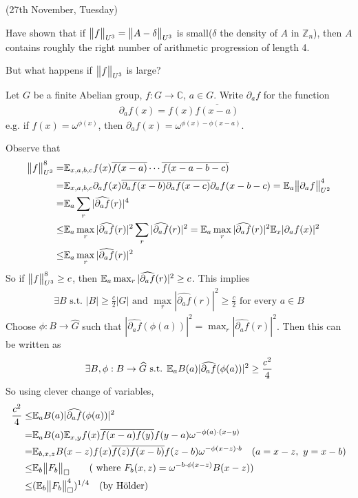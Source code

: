 \documentclass[12pt,a4paper]{report}
\renewcommand{\hat}{\widehat}
\begin{document}
\newday

(27th November, Tuesday)
\s

Have shown that if $\bigl\lVert f\bigr\rVert_{U^3} = \bigl\lVert A-\delta\bigr\rVert_{U^3}$ is small($\delta$ the density of $A$ in $\mathbb{Z}_n$), then $A$ contains roughly the right number of arithmetic progression of length 4.

\quad But what happens if $\bigl\lVert f\bigr\rVert_{U^3}$ is large?
\s

 Let $G$ be a finite Abelian group, $f: G\rightarrow \mathbb{C}$, $a\in G$. Write $\partial_a f$ for the function
\begin{align*}
\partial_a f(x) = f(x) \overline{f(x-a)}
\end{align*}
e.g. if $f(x) = \omega^{\phi(x)}$, then $\partial_a f(x) = \omega^{\phi(x) - \phi(x-a)}$.
\s

Observe that 
\begin{align*}
\norms{f}{U^3}^8 =& \avg_{x,a,b,c} f(x) \bar{f(x-a)} \cdots \bar{f(x-a-b-c)} \\
=& \avg_{x,a,b,c} \partial_a f(x) \bar{\partial_a f(x-b)} \bar{\partial_a f(x-c)} \partial_a f(x-b-c) = \avg_a \norms{\partial_a f}{U^2}^4 \\
=& \avg_a \sum_r |\hat{\partial_a f}(r)|^4 \\
\leq & \avg_a \max_r |\hat{\partial_a f}(r)|^2 \sum_r |\hat{\partial_a f}(r)|^2 = \avg_a \max_r |\hat{\partial_a f}(r)|^2 \avg_x | \partial_a f(x) |^2 \\
\leq & \avg_a \max_r |\hat{\partial_a f}(r)|^2
\end{align*}
So if $\bigl\lVert f\bigr\rVert_{U^3}^8 \geq c$, then $\avg_a  \max_r |\hat{\partial_a f}(r)|^2 \geq c$. This implies
\begin{align*}
\exists B \text{ s.t. } |B|\geq \frac{c}{2}|G| \text{ and } \max_r |\hat{\partial_a f}(r)|^2 \geq \frac{c}{2} \text{ for every } a\in B
\end{align*}
Choose $\phi : B \rightarrow \hat{G}$ such that $|\hat{\partial_{a}f}(\phi(a))|^2 = \max_r |\hat{\partial_a f}(r)|^2$. Then this can be written as
\begin{align*}
\exists B, \phi: B \rightarrow \hat{G} \text{ s.t. } \avg_a B(a) | \hat{\partial_a f}(\phi(a)) |^2 \geq \frac{c^2}{4}
\end{align*}
So using clever change of variables,
\begin{align*}
\frac{c^2}{4} \leq & \avg_a B(a) |\hat{\partial_a f}(\phi(a))|^2 \\
= & \avg_a B(a) \avg_{x,y} f(x) \bar{f(x-a)} \bar{f(y)} f(y-a) \omega^{-\phi(a) \cdot (x-y)} \\
= & \avg_{b,x,z} B(x-z) f(x) \bar{f(z)} \bar{f(x-b)} f(z-b) \omega^{-\phi(x-z) \cdot b} \quad (a=x-z,\,\, y=x-b) \\
\leq & \avg_b \boxnorm{F_b} \quad \quad (\text{ where } F_b(x,z) = \omega^{-b\cdot \phi(x-z)} B(x-z) ) \\
\leq & (\avg_b \boxnorm{F_b}^4)^{1/4} \quad (\text{by H\"{o}lder})
\end{align*}
\end{document}
